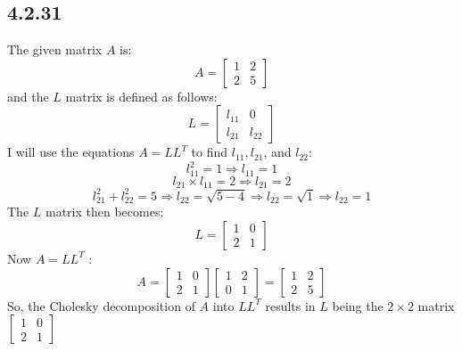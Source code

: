 \documentclass[manuscript,screen,review]{acmart}
\begin{document}
\subsection*{4.2.31}
The given matrix $A$ is:
$$
A=\left[\begin{array}{ll}
1 & 2 \\
2 & 5
\end{array}\right]
$$
and the $L$ matrix is defined as follows:
$$
L=\left[\begin{array}{ll}
l_{11} & 0 \\
l_{21} & l_{22}
\end{array}\right]
$$
I will use the equations $A=L L^T$ to find $l_{11}, l_{21}$, and $l_{22}$:
$$
l_{11}^2=1 \Rightarrow l_{11}=1
$$
$$
l_{21} \times l_{11}=2 \Rightarrow l_{21}=2
$$
$$
l_{21}^2+l_{22}^2=5 \Rightarrow l_{22}=\sqrt{5-4} \Rightarrow l_{22}=\sqrt{1} \Rightarrow l_{22}=1
$$
The $L$ matrix then becomes:
$$
L=\left[\begin{array}{ll}
1 & 0 \\
2 & 1
\end{array}\right]
$$
Now $A=L L^T$ :
$$
A=\left[\begin{array}{ll}
1 & 0 \\
2 & 1
\end{array}\right]\left[\begin{array}{ll}
1 & 2 \\
0 & 1
\end{array}\right]=\left[\begin{array}{ll}
1 & 2 \\
2 & 5
\end{array}\right]
$$
So, the Cholesky decomposition of $A$ into $L L^T$ results in $L$ being the $2 \times 2$ matrix $\left[\begin{array}{ll}1 & 0 \\ 2 & 1\end{array}\right]$
\end{document}
